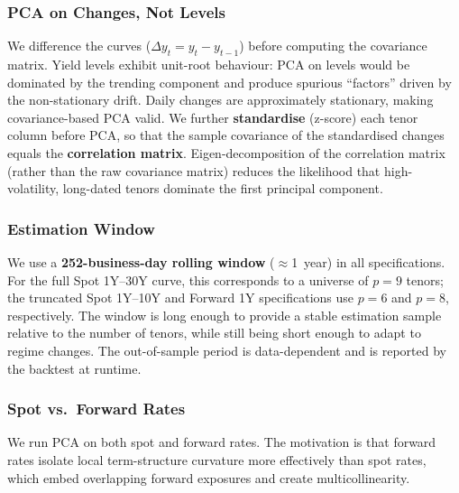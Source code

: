 \documentclass[11pt,a4paper]{article}
\begin{document}
\subsubsection{PCA on Changes, Not Levels}

We difference the curves ($\Delta y_t = y_t - y_{t-1}$) before computing
the covariance matrix.  Yield levels exhibit unit-root behaviour: PCA on
levels would be dominated by the trending component and produce spurious
``factors'' driven by the non-stationary drift.  Daily changes are
approximately stationary, making covariance-based PCA valid.  We further
\textbf{standardise} (z-score) each tenor column before PCA, so that the
sample covariance of the standardised changes equals the
\textbf{correlation matrix}. Eigen-decomposition of the correlation matrix (rather than the raw covariance matrix) reduces the likelihood that high-volatility, long-dated tenors dominate the first principal component.

\subsubsection{Estimation Window}
We use a \textbf{252-business-day rolling window} ($\approx$1~year) in all specifications. For the full Spot 1Y--30Y curve, this corresponds to a universe of $p=9$ tenors; the truncated Spot 1Y--10Y and Forward 1Y specifications use $p=6$ and $p=8$, respectively. The window is long enough to provide a stable estimation sample relative to the number of tenors, while still being short enough to adapt to regime changes. The out-of-sample period is data-dependent and is reported by the backtest at runtime.

\subsubsection{Spot vs.\ Forward Rates}

We run PCA on both spot and forward rates.  The motivation is that
forward rates isolate local term-structure curvature more effectively
than spot rates, which embed overlapping forward exposures and create
multicollinearity.
\end{document}

